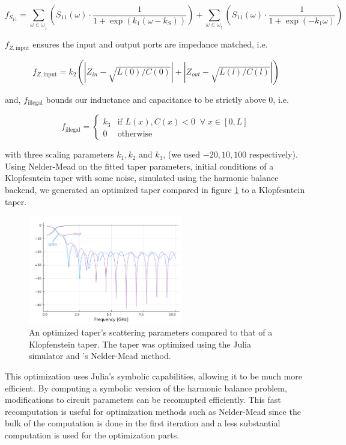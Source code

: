$$f_{S_{11}} = \sum_{\omega \in \omega_\downarrow} \left ( S_{11}(\omega) \cdot \dfrac{1}{1+\exp {(k_1 (\omega - k_S )) }} \right ) + \sum_{\omega \in \omega_\uparrow} \left ( S_{11}(\omega) \cdot \dfrac{1}{1+\exp {(-k_1 \omega) }} \right ) $$

$f_{Z, \text{input}}$ ensures the input and output ports are impedance matched, i.e.

$$f_{Z, \text{input}} = k_2 \left (  
\left |   Z_{in} - \sqrt{L(0)/C(0)}    \right | +
\left |   Z_{out} - \sqrt{L(l)/C(l)}    \right |
\right)$$

and, $f_{\text{illegal}}$ bounds our inductance and capacitance to be strictly above $0$, i.e.

$$f_{\text{illegal}} = \begin{cases}
        k_3 & \text{if } L(x), C(x) < 0\;\; \forall\; x\in [0, L]\\
        0 & \text{otherwise }
    \end{cases}
$$

with three scaling parameters $k_1, k_2$ and $k_3$, (we used $-20, 10, 100$ respectively). Using
Nelder-Mead on the fitted taper parameters, initial conditions of a Klopfesntein taper with some noise, 
simulated using the harmonic balance backend, we 
generated an optimized taper compared in figure \ref{fig:taper_optim} to a Klopfesntein taper.

\begin{figure}
    \centering
    \includegraphics[width=0.6\textwidth]{figs/optim_taper_preliminary_results copy.png}
    \caption{An optimized taper's scattering parameters compared to that of a Klopfenstein taper. The taper
    was optimized using the Julia simulator and 's Nelder-Mead method.}
    \label{fig:taper_optim}
\end{figure}

This optimization uses Julia's symbolic capabilities, allowing it to be much more efficient.
By computing a symbolic version of the harmonic balance problem, modifications to circuit
parameters can be recomupted efficiently. This fast recomputation is useful for optimization
methods such as Nelder-Mead since the bulk of the computation is done in the first iteration
and a less substantial computation is used for the optimization parts.


